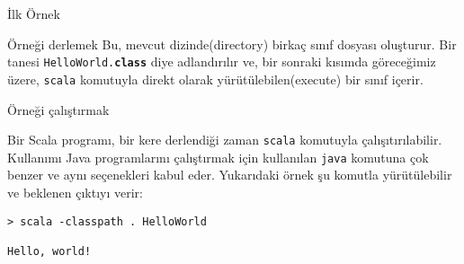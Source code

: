 \documentclass[10pt,a4paper]{book}
\begin{document}
\begin{chapter}{İlk Örnek}
\begin{section}{Örneği derlemek}
Bu, mevcut dizinde(directory) birkaç sınıf dosyası oluşturur. Bir tanesi \texttt{HelloWorld.\textbf{class}} diye adlandırılır ve, bir sonraki kısımda göreceğimiz üzere, \texttt{scala} komutuyla direkt olarak yürütülebilen(execute) bir sınıf içerir.

\end{section}

\begin{section}{Örneği çalıştırmak}

Bir Scala programı, bir kere derlendiği zaman \texttt{scala} komutuyla çalışıtırılabilir. Kullanımı Java programlarını çalıştırmak için kullanılan \texttt{java} komutuna çok benzer ve aynı seçenekleri kabul eder. Yukarıdaki örnek şu komutla yürütülebilir ve beklenen çıktıyı verir:

\begin{verbatim}
> scala -classpath . HelloWorld

Hello, world!
\end{verbatim}

\end{section}

\end{chapter}
\end{document}
